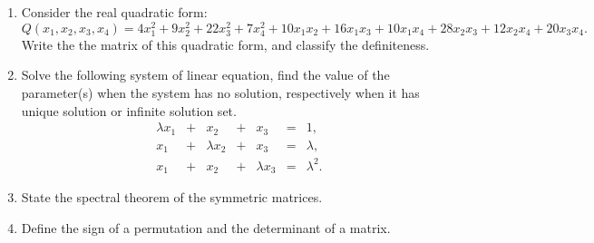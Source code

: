 \documentclass{report}
\begin{document}
\begin{enumerate}
\begin{enumerate}
\end{enumerate}
\item
Consider the real quadratic form:
\[
    Q\left( x_1,x_2,x_3,x_4 \right)=
    4x_1^2+9x_2^2+22x_3^2+7x_4^2
    +10x_1x_2+16x_1x_3+10x_1x_4+
    28x_2x_3+12x_2x_4+
    20x_3x_4.
\]
Write the the matrix of this quadratic form, and classify the definiteness.
\item
Solve the following system of linear equation, find the value of the parameter(s) when the system has no solution,
respectively when it has unique solution or infinite solution set.
\[\begin{array}{rcrcrcl}
\lambda x_1&+&x_2&+&x_3&=&1, \\
x_1&+&\lambda x_2&+&x_3&=&\lambda, \\
x_1&+&x_2&+&\lambda x_3&=&\lambda^2.
\end{array}
\]
\item State the spectral theorem of the symmetric matrices.
\item Define the sign of a permutation and the determinant of a matrix.
\end{enumerate}
\end{document}
